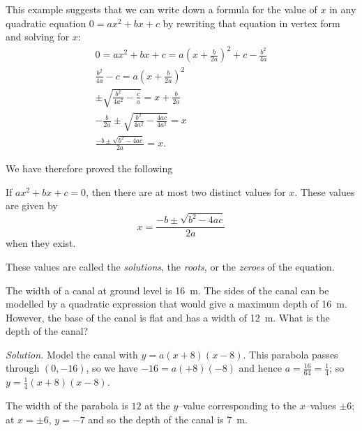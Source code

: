 This example suggests that we can write down a formula for the value of $ x $ in any quadratic equation $ 0 = ax^2 + bx + c $
by rewriting that equation in vertex form and solving for $ x $:
\begin{gather*}
  0 = ax^2 + bx + c = a\left(x + \frac{b}{2a}\right)^2 + c - \frac{b^2}{4a}\\
  \frac{b^2}{4a} - c = a\left(x + \frac{b}{2a}\right)^2\\
  \pm\sqrt{\frac{b^2}{4a^2} - \frac{c}{a}} = x + \frac{b}{2a}\\
  - \frac{b}{2a} \pm\sqrt{\frac{b^2}{4a^2} - \frac{4ac}{4a^2}} = x\\
  \frac{-b \pm \sqrt{b^2 - 4ac}}{2a} = x.
\end{gather*}

We have therefore proved the following
\begin{thm}
  If $ ax^2 + bx + c = 0 $, then there are at most two distinct values for $ x $. These values are given by
  \begin{displaymath}
    x = \frac{-b \pm \sqrt{b^2 - 4ac}}{2a}
  \end{displaymath}
  when they exist.
\end{thm}

These values are called the \emph{solutions}, the \emph{roots}, or the \emph{zeroes} of the equation.

\begin{ex}
  The width of a canal at ground level is \SI{16}{\metre}. The sides of the canal can  be modelled by a quadratic expression
  that would give a maximum depth of \SI{16}{\metre}. However, the base of the canal is flat and has a width of \SI{12}{\metre}.
  What is the depth of the canal?

  \textit{Solution.} Model the canal with $ y = a(x + 8)(x - 8) $. This parabola passes through $ (0, -16) $, so we have $ -16 = a(+8)(-8) $
  and hence $ a = \frac{16}{64} = \frac{1}{4} $; so $ y = \frac{1}{4}(x + 8)(x - 8) $.

  The width of the parabola is $ 12 $ at the $ y$--value corresponding to the $ x$--values $ \pm 6 $; at $ x = \pm 6 $, $ y = -7 $
  and so the depth of the canal is \SI{7}{\metre}.
\end{ex}

\clearpage
